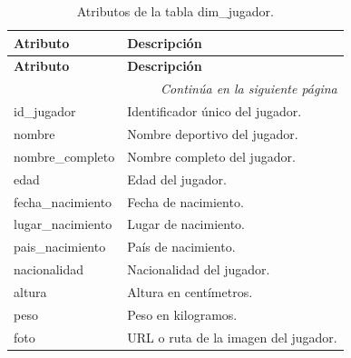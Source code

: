 \begin{longtable}{|l|l|}
\caption{Atributos de la tabla dim\_jugador.} \\

\hline
\textbf{Atributo} & \textbf{Descripción} \\
\hline
\endfirsthead

\hline
\textbf{Atributo} & \textbf{Descripción} \\
\hline
\endhead

\hline
\multicolumn{2}{r}{\textit{Continúa en la siguiente página}} \\
\hline
\endfoot

\hline
\endlastfoot

id\_jugador & Identificador único del jugador. \\
nombre & Nombre deportivo del jugador. \\
nombre\_completo & Nombre completo del jugador. \\
edad & Edad del jugador. \\
fecha\_nacimiento & Fecha de nacimiento. \\
lugar\_nacimiento & Lugar de nacimiento. \\
pais\_nacimiento & País de nacimiento. \\
nacionalidad & Nacionalidad del jugador. \\
altura & Altura en centímetros. \\
peso & Peso en kilogramos. \\
foto & URL o ruta de la imagen del jugador. \\
\hline

\end{longtable}

